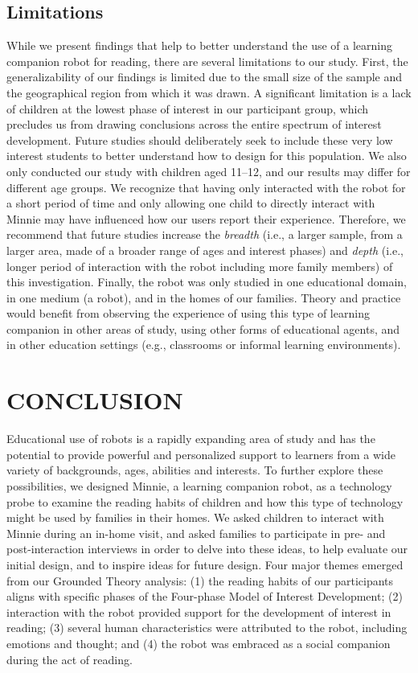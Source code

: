 \documentclass{sigchi}
\begin{document}
\subsection{Limitations}
While we present findings that help to better understand the use of a learning companion robot for reading, there are several limitations to our study. First, the generalizability of our findings is limited due to the small size of the sample and {\color{Purple}the geographical region from which it was drawn. A significant limitation is a lack of children at the lowest phase of interest in our participant group, which precludes us from drawing conclusions across the entire spectrum of interest development. Future studies should deliberately seek to include these very low interest students to better understand how to design for this population.}  We also only conducted our study with children aged 11--12, and our results may differ for different age groups. We recognize that having only interacted with the robot for a short period of time and only allowing one child to directly interact with Minnie may have influenced how our users report their experience. Therefore, we recommend that future studies increase the \textit{breadth} (i.e., a larger sample, from a larger area, made of a broader range of ages and interest phases) and \textit{depth} (i.e., longer period of interaction with the robot including more family members) of this investigation. Finally, the robot was only studied in one educational domain, in one medium (a robot), and in the homes of our families. Theory and practice would benefit from observing the experience of using this type of learning companion in other areas of study, using other forms of educational agents, and in other education settings (e.g., classrooms or informal learning environments).

\section{CONCLUSION}
Educational use of robots is a rapidly expanding area of study and has the potential to provide powerful and personalized support to learners from a wide variety of backgrounds, ages, abilities and interests. To further explore these possibilities, we designed Minnie, a learning companion robot, as a technology probe to examine the reading habits of children and how this type of technology might be used by families in their homes. We asked children to interact with Minnie during an in-home visit, and asked families to participate in pre- and post-interaction interviews in order to delve into these ideas, to help evaluate our initial design, and to inspire ideas for future design. Four major themes emerged from our Grounded Theory analysis: (1) the reading habits of our participants aligns with specific phases of the Four-phase Model of Interest Development; (2) interaction with the robot provided support for the development of interest in reading; (3) several human characteristics were attributed to the robot, including emotions and thought; and (4) the robot was embraced as a social companion during the act of reading.
\end{document}
